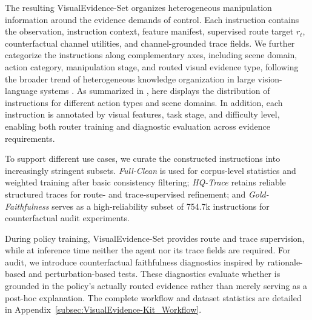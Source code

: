 The resulting VisualEvidence-Set organizes heterogeneous manipulation information around the evidence demands of control. Each instruction contains the observation, instruction context, feature manifest, supervised route target $r_t$, counterfactual channel utilities, and channel-grounded trace fields. We further categorize the instructions along complementary axes, including scene domain, action category, manipulation stage, and routed visual evidence type, following the broader trend of heterogeneous knowledge organization in large vision-language systems \citep{qwen2025qwen25vl,lin2025healthgpt}. As summarized in , here displays the distribution of instructions for different action types and scene domains. In addition, each instruction is annotated by visual features, task stage, and difficulty level, enabling both router training and diagnostic evaluation across evidence requirements.

To support different use cases, we curate the constructed instructions into increasingly stringent subsets. \textit{Full-Clean} is used for corpus-level statistics and weighted training after basic consistency filtering; \textit{HQ-Trace} retains reliable structured traces for route- and trace-supervised refinement; and \textit{Gold-Faithfulness} serves as a high-reliability subset of 754.7k instructions for counterfactual audit experiments.

During policy training, VisualEvidence-Set provides route and trace supervision, while at inference time neither the agent nor its trace fields are required. For audit, we introduce counterfactual faithfulness diagnostics inspired by rationale-based and perturbation-based tests. These diagnostics evaluate whether \thinkimg{} is grounded in the policy's actually routed evidence rather than merely serving as a post-hoc explanation. The complete workflow and dataset statistics are detailed in Appendix~\ref{subsec:VisualEvidence-Kit_Workflow}.
